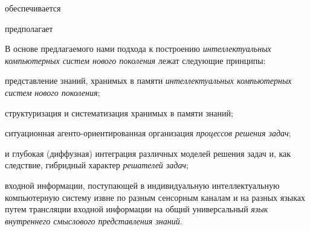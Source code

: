 \begin{SCn}
	\begin{scnrelfromlist}{обеспечивается}
	\end{scnrelfromlist}

	\begin{scnrelfromlist}{предполагает}
		\begin{scnindent}
		\end{scnindent}
	\end{scnrelfromlist}

\end{SCn}



В основе предлагаемого нами подхода к построению \textit{интеллектуальных компьютерных систем нового поколения} лежат следующие принципы:
\begin{textitemize}
	\item {} представление знаний, хранимых в памяти \textit{интеллектуальных компьютерных систем нового поколения};
	\item {} структуризация и систематизация хранимых в памяти знаний;
	\item {} ситуационная агенто-ориентированная организация \textit{процессов решения задач};
	\item {} и глубокая (диффузная) интеграция различных моделей решения задач и, как следствие, гибридный характер \textit{решателей задач};
	\item {} входной информации, поступающей в индивидуальную интеллектуальную компьютерную систему извне по разным сенсорным каналам и на разных языках путем трансляции входной информации на общий универсальный \textit{язык внутреннего смыслового представления знаний}.
\end{textitemize}


